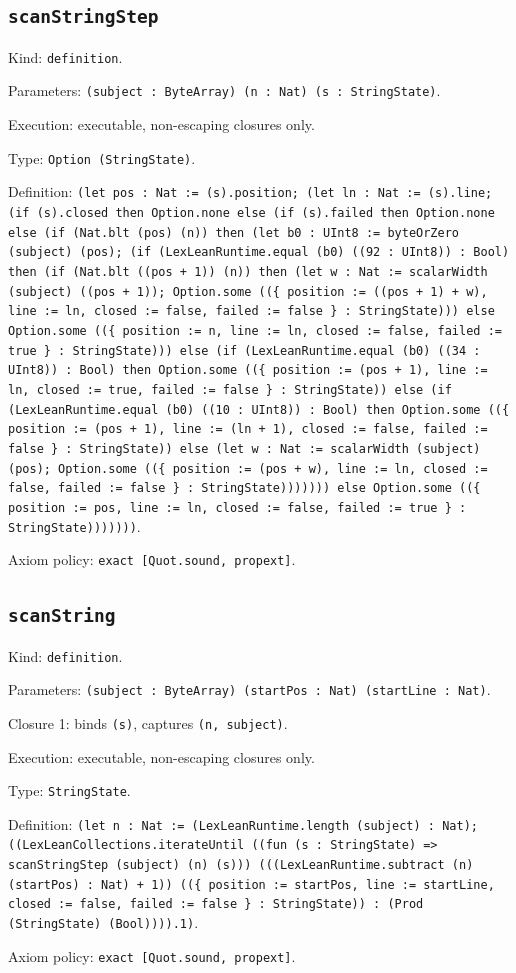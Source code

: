 \documentclass[11pt]{article}
\begin{document}
\subsection*{\texttt{scanStringStep}}
\noindent Kind: \texttt{definition}.\par
\noindent Parameters: \texttt{(subject : ByteArray) (n : Nat) (s : StringState)}.\par
\noindent Execution: executable, non-escaping closures only.\par
\noindent Type: \texttt{Option (StringState)}.\par
\noindent Definition: \texttt{(let pos : Nat := (s).position; (let ln : Nat := (s).line; (if (s).closed then Option.none else (if (s).failed then Option.none else (if (Nat.blt (pos) (n)) then (let b0 : UInt8 := byteOrZero (subject) (pos); (if (LexLeanRuntime.equal (b0) ((92 : UInt8)) : Bool) then (if (Nat.blt ((pos + 1)) (n)) then (let w : Nat := scalarWidth (subject) ((pos + 1)); Option.some ((\{ position := ((pos + 1) + w), line := ln, closed := false, failed := false \} : StringState))) else Option.some ((\{ position := n, line := ln, closed := false, failed := true \} : StringState))) else (if (LexLeanRuntime.equal (b0) ((34 : UInt8)) : Bool) then Option.some ((\{ position := (pos + 1), line := ln, closed := true, failed := false \} : StringState)) else (if (LexLeanRuntime.equal (b0) ((10 : UInt8)) : Bool) then Option.some ((\{ position := (pos + 1), line := (ln + 1), closed := false, failed := false \} : StringState)) else (let w : Nat := scalarWidth (subject) (pos); Option.some ((\{ position := (pos + w), line := ln, closed := false, failed := false \} : StringState))))))) else Option.some ((\{ position := pos, line := ln, closed := false, failed := true \} : StringState)))))))}.\par
\noindent Axiom policy: \texttt{exact [Quot.sound, propext]}.\par
\subsection*{\texttt{scanString}}
\noindent Kind: \texttt{definition}.\par
\noindent Parameters: \texttt{(subject : ByteArray) (startPos : Nat) (startLine : Nat)}.\par
\noindent Closure 1: binds \texttt{(s)}, captures \texttt{(n, subject)}.\par
\noindent Execution: executable, non-escaping closures only.\par
\noindent Type: \texttt{StringState}.\par
\noindent Definition: \texttt{(let n : Nat := (LexLeanRuntime.length (subject) : Nat); ((LexLeanCollections.iterateUntil ((fun (s : StringState) => scanStringStep (subject) (n) (s))) (((LexLeanRuntime.subtract (n) (startPos) : Nat) + 1)) ((\{ position := startPos, line := startLine, closed := false, failed := false \} : StringState)) : (Prod (StringState) (Bool)))).1)}.\par
\noindent Axiom policy: \texttt{exact [Quot.sound, propext]}.\par
\end{document}
